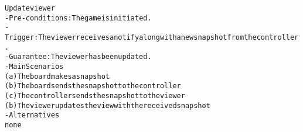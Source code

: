 \begin{alltt}

Update viewer
- Pre-conditions: The game is initiated.
- Trigger: The viewer receives a notify along with a new snapshot from the controller.
- Guarantee: The viewer has been updated.
- Main Scenarios
    (a) The board makes a snapshot
    (b) The board sends the snapshot to the controller
    (c) The controller sends the snapshot to the viewer
    (b) The viewer updates the view with the received snapshot
- Alternatives
    none
    
\end{alltt}